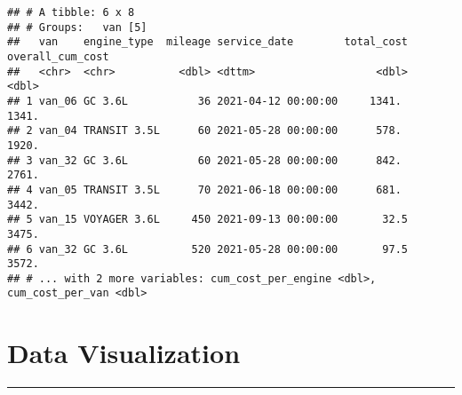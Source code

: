 \documentclass[
]{article}
\newenvironment{Shaded}{\begin{snugshade}}{\end{snugshade}}
\newcommand{\AttributeTok}[1]{\textcolor[rgb]{0.77,0.63,0.00}{#1}}
\newcommand{\CommentTok}[1]{\textcolor[rgb]{0.56,0.35,0.01}{\textit{#1}}}
\newcommand{\FunctionTok}[1]{\textcolor[rgb]{0.00,0.00,0.00}{#1}}
\newcommand{\NormalTok}[1]{#1}
\newcommand{\OtherTok}[1]{\textcolor[rgb]{0.56,0.35,0.01}{#1}}
\newcommand{\SpecialCharTok}[1]{\textcolor[rgb]{0.00,0.00,0.00}{#1}}
\begin{document}
\begin{Shaded}
\end{Shaded}

\begin{verbatim}
## # A tibble: 6 x 8
## # Groups:   van [5]
##   van    engine_type  mileage service_date        total_cost overall_cum_cost
##   <chr>  <chr>          <dbl> <dttm>                   <dbl>            <dbl>
## 1 van_06 GC 3.6L           36 2021-04-12 00:00:00     1341.             1341.
## 2 van_04 TRANSIT 3.5L      60 2021-05-28 00:00:00      578.             1920.
## 3 van_32 GC 3.6L           60 2021-05-28 00:00:00      842.             2761.
## 4 van_05 TRANSIT 3.5L      70 2021-06-18 00:00:00      681.             3442.
## 5 van_15 VOYAGER 3.6L     450 2021-09-13 00:00:00       32.5            3475.
## 6 van_32 GC 3.6L          520 2021-05-28 00:00:00       97.5            3572.
## # ... with 2 more variables: cum_cost_per_engine <dbl>, cum_cost_per_van <dbl>
\end{verbatim}

\hypertarget{data-visualization}{%
\section{Data Visualization}\label{data-visualization}}

\begin{center}\rule{0.5\linewidth}{0.5pt}\end{center}
\end{document}
